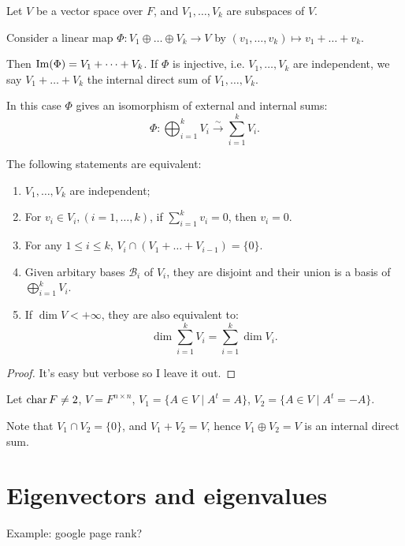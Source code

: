 \begin{remark}
    Let $V$ be a vector space over $F$, and $V_1,\dots,V_k$ are subspaces of $V$.

	Consider a linear map  $\Phi: V_1\oplus \dots\oplus V_k\to V$ by
	$(v_1,\dots,v_k)\mapsto v_1+\dots+v_k$.

	Then $\operatorname{Im}(\Phi) = V_1+\dots+V_k$.
	If $\Phi$ is injective, i.e.  $V_1,\dots,V_k$ are independent, we say
	$V_1+\dots+V_k$ the internal direct sum of  $V_1,\dots,V_k$.

	In this case $\Phi$ gives an isomorphism of external and internal sums:
	\[
		\Phi: \bigoplus_{i=1}^k V_i \xrightarrow{\sim} \sum_{i=1}^k V_i.
	\]
\end{remark}

\begin{lemma}
	The following statements are equivalent:
	\begin{enumerate}
		\item $V_1,\dots, V_k$ are independent;
		\item For $v_i\in V_i, (i=1,\dots,k)$, if $\sum_{i=1}^kv_i =0$, then  $v_i=0$.
		\item For any  $1\le i\le k$,  $V_i\cap (V_1+\dots+V_{i-1})=\{0\}$.
		\item Given arbitary bases  $\mathcal{B}_i$ of $V_i$,
			they are disjoint and their union is a basis of $\bigoplus_{i=1}^k V_i$.
		\item If $\dim V<+\infty$, they are also equivalent to:
		\[
			\dim \sum_{i=1}^{k} V_i = \sum_{i=1}^{k} \dim V_i.
		\]
	\end{enumerate}
\end{lemma}
\begin{proof}[Proof]
    It's easy but verbose so I leave it out.
\end{proof}

\begin{example}
	Let $\operatorname{char} F \ne 2$,  $V=F^{n \times n}$, $V_1 = \{A\in V\mid A^t=A\}$,
	$V_2 = \{A\in V\mid A^t = -A\}$.

	Note that $V_1\cap V_2 = \{0\}$, and $V_1+V_2 = V$,
	hence $V_1\oplus V_2=V$ is an internal direct sum.
\end{example}

\section{Eigenvectors and eigenvalues}
\label{sec:Eigenvectors and eigenvalues}
Example: google page rank?

